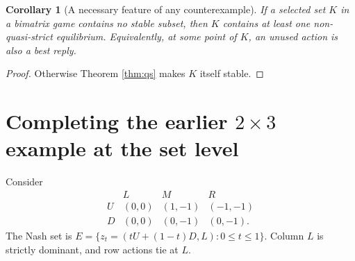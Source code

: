 \documentclass[11pt]{article}
\newtheorem{corollary}[theorem]{Corollary}
\theoremstyle{definition}
\theoremstyle{remark}
\begin{document}
\begin{corollary}[A necessary feature of any counterexample]
\label{cor:boundary}
If a selected set $K$ in a bimatrix game contains no stable subset, then
$K$ contains at least one non-quasi-strict equilibrium. Equivalently,
at some point of $K$, an unused action is also a best reply.
\end{corollary}
\begin{proof}
Otherwise Theorem \ref{thm:qs} makes $K$ itself stable.
\end{proof}


\section{Completing the earlier \texorpdfstring{$2\times3$}{2 x 3} example at the set level}
Consider
\begin{equation}\label{eq:example}
 \begin{array}{c|ccc}
  &L&M&R\\\hline
  U&(0,0)&(1,-1)&(-1,-1)\\
  D&(0,0)&(0,-1)&(0,-1).
 \end{array}
\end{equation}
The Nash set is $E=\{z_t=(tU+(1-t)D,L):0\le t\le1\}$.
Column $L$ is strictly dominant, and row actions tie at $L$.
\end{document}
